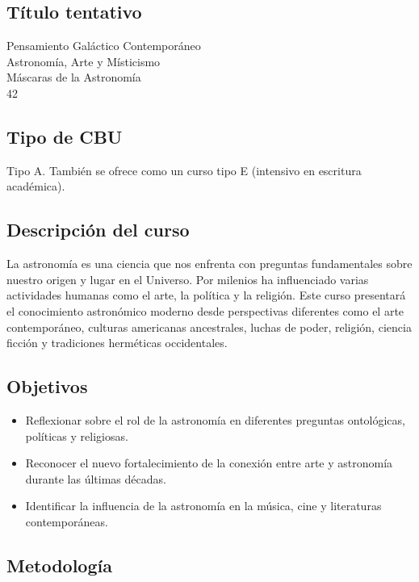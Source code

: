 \documentclass{report}
\begin{document}
\subsection*{\bf T\'itulo tentativo}
Pensamiento Gal\'actico Contempor\'aneo\\
Astronom\'ia, Arte y M\'isticismo\\
M\'ascaras de la Astronom\'ia\\
42\\

\subsection*{Tipo de CBU}
Tipo A. Tambi\'en se ofrece como un curso tipo E (intensivo en
escritura acad\'emica). 


\subsection*{Descripci\'on del curso}
La astronom\'ia es una ciencia que nos enfrenta con preguntas
fundamentales sobre nuestro origen y lugar en el Universo. Por
milenios ha influenciado varias actividades humanas como el arte, la
pol\'itica y la religi\'on. Este curso presentar\'a el conocimiento
astron\'omico moderno desde perspectivas diferentes como el arte
contempor\'aneo, culturas americanas ancestrales, luchas de poder,
religi\'on, ciencia ficci\'on y tradiciones herm\'eticas occidentales.  

\subsection*{Objetivos}

\begin{itemize}
\item Reflexionar sobre el rol de la astronom\'ia en diferentes
  preguntas ontol\'ogicas, pol\'iticas y religiosas. 
\item Reconocer el nuevo fortalecimiento de la conexi\'on entre arte y
  astronom\'ia durante las \'ultimas d\'ecadas.
\item Identificar la influencia de la astronom\'ia en la m\'usica,
  cine y literaturas contempor\'aneas.
\end{itemize}

\subsection*{Metodolog\'ia}
\end{document}
